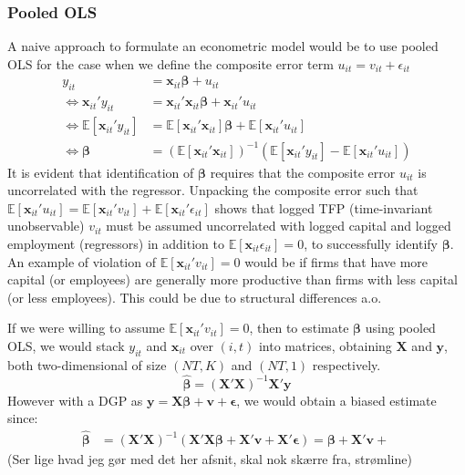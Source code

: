 \subsubsection*{Pooled OLS}
A naive approach to formulate an econometric model would be to use pooled OLS for the case when we define the composite error term $u_{it}=v_{it}+\epsilon_{it}$
\begin{align*}
    y_{it} &= \pmb{x}_{it} \pmb{\beta}  +u_{it} \\
    \Leftrightarrow \pmb{x}_{it}'y_{it}&=\pmb{x}_{it}'\pmb{x}_{it}\pmb{\beta} +\pmb{x}_{it}'u_{it} \\
    \Leftrightarrow \mathbb{E}[\pmb{x}_{it}'y_{it}] &=\mathbb{E}[\pmb{x}_{it}'\pmb{x}_{it}] \pmb{\beta}  + \mathbb{E}[\pmb{x}_{it}'u_{it}] \\ \Leftrightarrow  \pmb{\beta} &= (\mathbb{E}[\pmb{x}_{it}'\pmb{x}_{it}])^{-1} \left(  \mathbb{E}[\pmb{x}_{it}'y_{it}]-\mathbb{E}[\pmb{x}_{it}' u_{it}]\right)
\end{align*}
It is evident that identification of $\pmb{\beta}$ requires that the composite error $u_{it}$ is uncorrelated with the regressor. Unpacking the composite error such that $\mathbb{E}[\pmb{x}_{it}'u_{it}]=\mathbb{E}[\pmb{x}_{it}'v_{it}]+\mathbb{E}[\pmb{x}_{it}'\epsilon_{it}]$ shows that logged TFP (time-invariant unobservable) $v_{it}$ must be assumed uncorrelated with logged capital and logged employment (regressors) in addition to $\mathbb{E}[\pmb{x}_{it} \epsilon_{it}]=0$, to successfully identify $\pmb{\beta}$. An example of violation of $\mathbb{E}[\pmb{x}_{it}'v_{it}]=0$ would be if firms that have more capital (or employees) are generally more productive than firms with less capital (or less employees). This could be due to structural differences a.o. 

If we were willing to assume $\mathbb{E}[\pmb{x}_{it}'v_{it}]=0$, then to estimate $\pmb{\beta}$ using pooled OLS, we would stack $y_{it}$ and $\pmb{x}_{it}$ over $(i,t)$ into matrices, obtaining $\pmb{X}$ and $\pmb{y}$, both two-dimensional of size $(NT,K)$ and $(NT,1)$ respectively.
$$\hat{\pmb{\beta}} = (\pmb{X}' \pmb{X})^{-1}\pmb{X}'\pmb{y}$$
However with a DGP as $\pmb{y}=\pmb{X}\pmb{\beta}+\pmb{v}+\pmb{\epsilon}$, we would obtain a biased estimate since:
\begin{align*}
    \hat{\pmb{\beta}} &= (\pmb{X}'\pmb{X})^{-1} (\pmb{X}'\pmb{X}\pmb{\beta} +\pmb{X}'\pmb{v}+\pmb{X}'\pmb{\epsilon})=\pmb{\beta}+\pmb{X}'\pmb{v} +\
\end{align*}
(Ser lige hvad jeg gør med det her afsnit, skal nok skærre fra, strømline)

